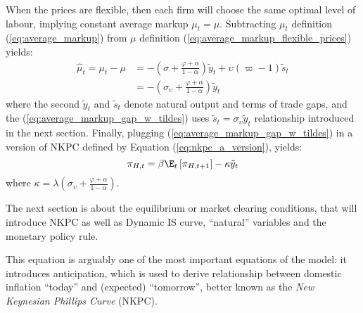 When the prices are flexible, then each firm will choose the same optimal level of labour, implying constant average markup $\mu_t = \mu$. Subtracting $\mu_t$ definition (\ref{eq:average_markup}) from $\mu$ definition (\ref{eq:average_markup_flexible_prices}) yields:
\begin{align}
    \hat{\mu}_t = \mu_t - \mu &= - \left( \sigma + \frac{\varphi + \alpha}{1-\alpha}\right) \tilde{y}_t + \upsilon(\varpi-1)\tilde{s}_t \\
     &= - \left( \sigma_\upsilon + \frac{\varphi + \alpha}{1-\alpha}\right) \tilde{y}_t \label{eq:average_markup_gap_w_tildes}
\end{align}
where the second $\tilde{y}_t$ and $\tilde{s}_t$ denote natural output and terms of trade gaps, and the (\ref{eq:average_markup_gap_w_tildes}) uses $\tilde{s}_t=\sigma_\upsilon \tilde{y}_t$ relationship introduced in the next section. Finally, plugging (\ref{eq:average_markup_gap_w_tildes}) in a version of NKPC defined by Equation (\ref{eq:nkpc_a_version}), yields:
\begin{equation}
    \pi_{H,t} = \beta \E_t \left[ \pi_{H,t+1}\right] - \kappa \tilde{y}_t
\end{equation}
where $\kappa=\lambda\left( \sigma_\upsilon + \frac{\varphi + \alpha}{1-\alpha}\right)$.


The next section is about the equilibrium or market clearing conditions, that will introduce NKPC as well as Dynamic IS curve, ``natural'' variables and the monetary policy rule. 

This equation is arguably one of the most important equations of the model: it introduces anticipation, which is used to derive relationship between domestic inflation ``today'' and (expected) ``tomorrow'', better known as the \textit{New Keynesian Phillips Curve} (NKPC). 